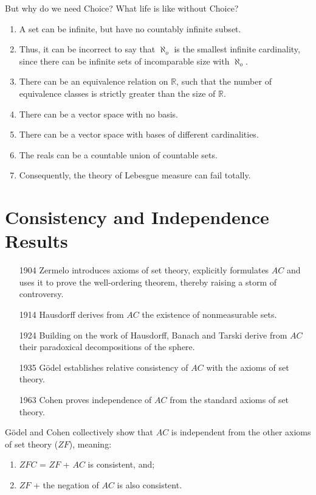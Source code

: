 \documentclass[11pt]{article}
\theoremstyle{definition}
\begin{document}
But why do we need Choice? What life is like without Choice?

\begin{enumerate}
\item A set can be infinite, but have no countably infinite subset.
\item Thus, it can be incorrect to say that $\aleph_o$ is the smallest infinite cardinality, since there can be infinite sets of incomparable size with  $\aleph_o$.
\item There can be an equivalence relation on $\mathbb{R}$, such that the number of equivalence classes is strictly greater than the size of $\mathbb{R}$.
\item There can be a vector space with no basis.
\item There can be a vector space with bases of different cardinalities.
\item The reals can be a countable union of countable sets.
\item Consequently, the theory of Lebesgue measure can fail totally.
\end{enumerate}

\section{Consistency and Independence Results}

\begin{enumerate}
\item[1904] Zermelo introduces axioms of set theory, explicitly formulates $AC$ and uses it to prove the well-ordering theorem, thereby raising a storm of controversy.
\item[1914] Hausdorff derives from $AC$ the existence of nonmeasurable sets.
\item[1924] Building on the work of Hausdorff, Banach and Tarski derive from $AC$ their paradoxical decompositions of the sphere.
\item[1935] Gödel establishes relative consistency of $AC$ with the axioms of set theory.
\item[1963] Cohen proves independence of $AC$ from the standard axioms of set theory.
\end{enumerate}

Gödel and Cohen collectively show that $AC$ is independent from the other axioms of set theory ($ZF$), meaning:
\begin{enumerate}
\item $ZFC$ = $ZF$ + $AC$ is consistent, and;
\item $ZF$ + the negation of $AC$ is also consistent.
\end{enumerate}
\end{document}
